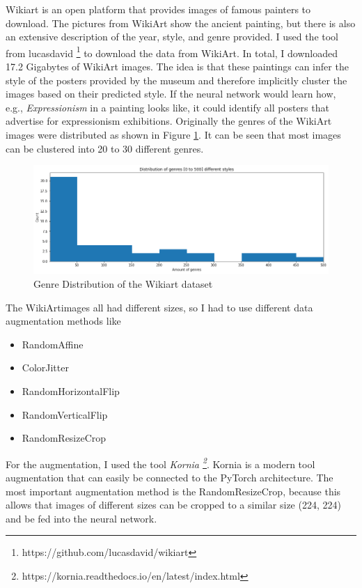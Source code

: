 \documentclass[conference]{IEEEtran}
\begin{document}
Wikiart is an open platform that provides images of famous painters to download. The pictures from WikiArt show the ancient painting, but there is also an extensive description of the year, style, and genre provided. I used the tool from lucasdavid \footnote{https://github.com/lucasdavid/wikiart} to download the data from WikiArt. In total, I downloaded 17.2 Gigabytes of WikiArt images. The idea is that these paintings can infer the style of the posters provided by the museum and therefore implicitly cluster the images based on their predicted style. If the neural network would learn how, e.g., \textit{Expressionism} in a painting looks like, it could identify all posters that advertise for expressionism exhibitions. Originally the genres of the WikiArt images were distributed as shown in Figure \ref{fig:wikiart_labels}. It can be seen that most images can be clustered into 20 to 30 different genres.

\begin{figure}
\centering
\includegraphics[width=1\linewidth]{../Imgs/num_genres}
\caption{Genre Distribution of the Wikiart dataset}
\label{fig:wikiart_labels}
\end{figure}

The WikiArtimages all had different sizes, so I had to use different data augmentation methods like \newline

\begin{itemize}
\item RandomAffine
\item ColorJitter
\item RandomHorizontalFlip
\item RandomVerticalFlip
\item RandomResizeCrop \newline
\end{itemize}

For the augmentation, I used the tool \textit{Kornia \footnote{https://kornia.readthedocs.io/en/latest/index.html}}. Kornia is a modern tool augmentation \cite{Riba.05.10.2019} that can easily be connected to the PyTorch architecture. The most important augmentation method is the RandomResizeCrop, because this allows that images of different sizes can be cropped to a similar size (224, 224) and be fed into the neural network.
\end{document}
